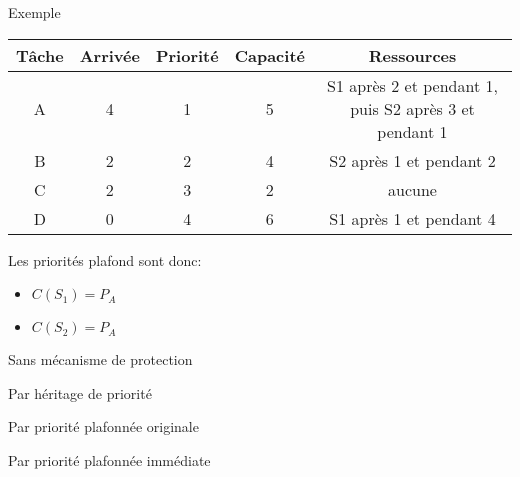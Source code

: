 \begin{frame}{Exemple}
  \begin{center}
    \begin{tabular}{ccccc}
      \hline
      Tâche & Arrivée & Priorité & Capacité & Ressources \\
      \hline
      A & 4 & 1 & 5 & S1 après 2 et pendant 1, puis S2 après 3 et pendant 1\\
      B & 2 & 2 & 4 & S2 après 1 et pendant 2 \\
      C & 2 & 3 & 2 & aucune\\
      D & 0 & 4 & 6 & S1 après 1 et pendant 4\\
      \hline
    \end{tabular}
  \end{center}
  Les priorités plafond sont donc: 
  \begin{itemize}
  \item $C(S_1) = P_A$ 
  \item $C(S_2) = P_A$ 
  \end{itemize}
\end{frame} 

\begin{frame}{Sans mécanisme de protection}
  
\end{frame} 

\begin{frame}{Par héritage de priorité}
  
\end{frame} 

\begin{frame}{Par priorité plafonnée originale}
  
\end{frame} 

\begin{frame}{Par priorité plafonnée immédiate}
  
\end{frame} 

